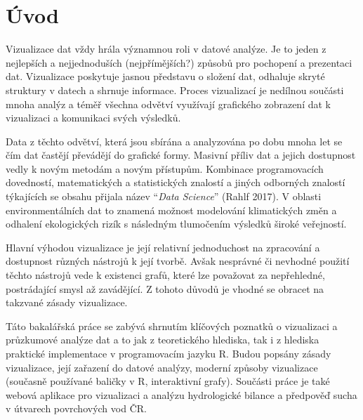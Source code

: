 \documentclass[12pt,]{article}
\title{}
\author{}
\date{}
\begin{document}


\tableofcontents

\newpage

\listoffigures
\listoftables

\newpage

\section{Úvod}\label{uvod}

\pagestyle{plain} \setcounter{page}{1}

\qquad Vizualizace dat vždy hrála významnou roli v datové analýze. Je to
jeden z nejlepších a nejjednoduších (nejpřímějších?) způsobů pro
pochopení a prezentaci dat. Vizualizace poskytuje jasnou představu o
složení dat, odhaluje skryté struktury v datech a shrnuje informace.
Proces vizualizací je nedílnou součásti mnoha analýz a téměř všechna
odvětví využívají grafického zobrazení dat k vizualizaci a komunikaci
svých výsledků.

\qquad Data z těchto odvětví, která jsou sbírána a analyzována po dobu
mnoha let se čím dat častějí převádějí do grafické formy. Masivní příliv
dat a jejich dostupnost vedly k novým metodám a novým přístupům.
Kombinace programovacích dovedností, matematických a statistických
znalostí a jiných odborných znalostí týkajících se obsahu přijala název
\enquote{\emph{Data Science}} (Rahlf 2017). V oblasti environmentálních
dat to znamená možnost modelování klimatických změn a odhalení
ekologických rizík s následným tlumočením výsledků široké veřejností.

\qquad Hlavní výhodou vizualizace je její relativní jednoduchost na
zpracování a dostupnost různých nástrojů k její tvorbě. Avšak nesprávné
či nevhodné použití těchto nástrojů vede k existenci grafů, které lze
považovat za nepřehledné, postrádající smysl až zavádějící. Z tohoto
důvodů je vhodné se obracet na takzvané zásady vizualizace.

\qquad Táto bakalářská práce se zabývá shrnutím klíčových poznatků o
vizualizaci a průzkumové analýze dat a to jak z teoretického hlediska,
tak i z hlediska praktické implementace v programovacím jazyku R. Budou
popsány zásady vizualizace, její zařazení do datové analýzy, moderní
způsoby vizualizace (současně používané baličky v R, interaktivní
grafy). Součásti práce je také webová aplikace pro vizualizaci a analýzu
hydrologické bilance a předpověď sucha v útvarech povrchových vod ČR.

\newpage
\end{document}
